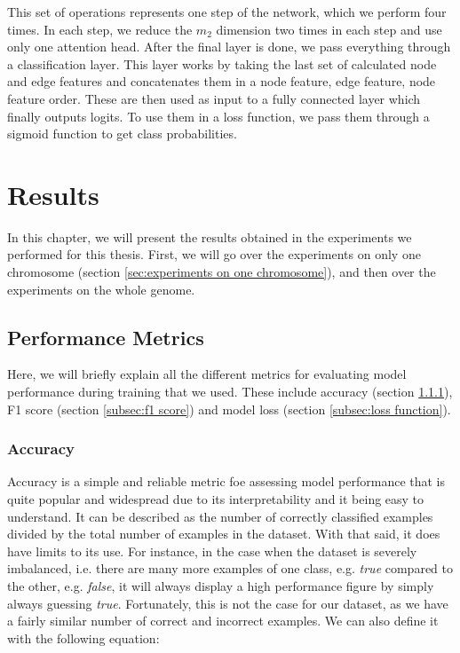 \documentclass[times, utf8, diplomski, english]{fer_eng}
\begin{document}
This set of operations represents one step of the network, which we perform four times. In each step, we reduce the $m_2$ dimension two times in each step and use only one attention head. After the final layer is done, we pass everything through a classification layer. This layer works by taking the last set of calculated node and edge features and concatenates them in a node feature, edge feature, node feature order. These are then used as input to a fully connected layer which finally outputs logits. To use them in a loss function, we pass them through a sigmoid function to get class probabilities.


\chapter{Results}
\label{ch:results}

In this chapter, we will present the results obtained in the experiments we performed for this thesis. First, we will go over the experiments on only one chromosome (section \ref{sec:experiments on one chromosome}), and then over the experiments on the whole genome.

\section{Performance Metrics}

Here, we will briefly explain all the different metrics for evaluating model performance during training that we used. These include accuracy (section \ref{subsec:accuracy}), F1 score (section \ref{subsec:f1 score}) and model loss (section \ref{subsec:loss function}).

\subsection{Accuracy}
\label{subsec:accuracy}

Accuracy is a simple and reliable metric foe assessing model performance that is quite popular and widespread due to its interpretability and it being easy to understand. It can be described as the number of correctly classified examples divided by the total number of examples in the dataset. With that said, it does have limits to its use. For instance, in the case when the dataset is severely imbalanced, i.e. there are many more examples of one class, e.g. \textit{true} compared to the other, e.g. \textit{false}, it will always display a high performance figure by simply always guessing \textit{true}. Fortunately, this is not the case for our dataset, as we have a fairly similar number of correct and incorrect examples. We can also define it with the following equation:
\end{document}
